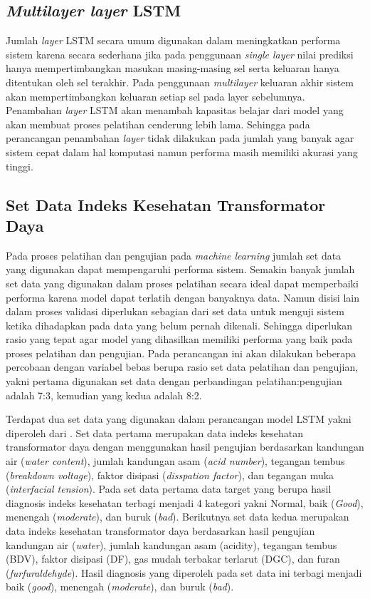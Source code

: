 \subsection{\textit{Multilayer layer} LSTM}
Jumlah \textit{layer} LSTM secara umum digunakan dalam meningkatkan performa sistem karena secara sederhana jika pada penggunaan \textit{single layer} nilai prediksi hanya mempertimbangkan masukan masing-masing sel serta keluaran hanya ditentukan oleh sel terakhir. Pada penggunaan \textit{multilayer} keluaran akhir sistem akan mempertimbangkan keluaran setiap sel pada layer sebelumnya. Penambahan \textit{layer} LSTM akan menambah kapasitas belajar dari model yang akan membuat proses pelatihan cenderung lebih lama. Sehingga pada perancangan penambahan \textit{layer} tidak dilakukan pada jumlah yang banyak agar sistem cepat dalam hal komputasi namun performa masih memiliki akurasi yang tinggi. 

\subsection{Set Data Indeks Kesehatan Transformator Daya}
Pada proses pelatihan dan pengujian pada \textit{machine learning} jumlah set data yang digunakan dapat mempengaruhi performa sistem. Semakin banyak jumlah set data yang digunakan dalam proses pelatihan secara ideal dapat memperbaiki performa karena model dapat terlatih dengan banyaknya data. Namun disisi lain dalam proses validasi diperlukan sebagian dari set data untuk menguji sistem ketika dihadapkan pada data yang belum pernah dikenali. Sehingga diperlukan rasio yang tepat agar model yang dihasilkan memiliki performa yang baik pada proses pelatihan dan pengujian. Pada perancangan ini akan dilakukan beberapa percobaan dengan variabel bebas berupa rasio set data pelatihan dan pengujian, yakni pertama digunakan set data dengan perbandingan pelatihan:pengujian adalah 7:3, kemudian yang kedua adalah 8:2. 

Terdapat dua set data yang digunakan dalam perancangan model LSTM yakni diperoleh dari \cite{abdillah2020prognostics, shah2016predict, abu2012calculation}. Set data pertama merupakan data indeks kesehatan transformator daya dengan menggunakan hasil pengujian berdasarkan kandungan air (\textit{water content}), jumlah kandungan asam (\textit{acid number}), tegangan tembus (\textit{breakdown voltage}), faktor disipasi (\textit{disspation factor}), dan tegangan muka (\textit{interfacial tension}). Pada set data pertama data target yang berupa hasil diagnosis indeks kesehatan terbagi menjadi 4 kategori yakni Normal, baik (\textit{Good}), menengah (\textit{moderate}), dan buruk (\textit{bad}).
Berikutnya set data kedua merupakan data indeks kesehatan transformator daya berdasarkan hasil pengujian kandungan air (\textit{water}), jumlah kandungan asam (acidity), tegangan tembus (BDV), faktor disipasi (DF), gas mudah terbakar terlarut (DGC), dan furan (\textit{furfuraldehyde}). Hasil diagnosis yang diperoleh pada set data ini terbagi menjadi baik (\textit{good}), menengah (\textit{moderate}), dan buruk (\textit{bad}).

